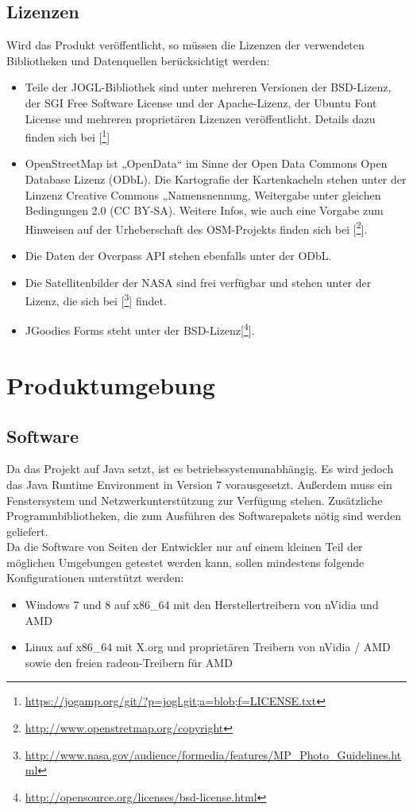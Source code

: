 \documentclass[10pt]{scrreprt}
\begin{document}
\section{Lizenzen}
Wird das Produkt veröffentlicht, so müssen die Lizenzen der verwendeten Bibliotheken und Datenquellen berücksichtigt werden:
\begin{itemize}
\item Teile der JOGL-Bibliothek sind unter mehreren Versionen der BSD-Lizenz, der SGI Free Software License und der Apache-Lizenz, der Ubuntu Font License und mehreren proprietären Lizenzen veröffentlicht. Details dazu finden sich bei [\footnote{\url{https://jogamp.org/git/?p=jogl.git;a=blob;f=LICENSE.txt}}]
\item OpenStreetMap ist „OpenData“ im Sinne der Open Data Commons Open Database Lizenz (ODbL). Die Kartografie der Kartenkacheln stehen unter der Linzenz  Creative Commons „Namensnennung, Weitergabe unter gleichen Bedingungen 2.0 (CC BY-SA). Weitere Infos, wie auch eine Vorgabe zum Hinweisen auf der Urheberschaft des OSM-Projekts finden sich bei [\footnote{\url{http://www.openstretmap.org/copyright}}].
\item Die Daten der Overpass API stehen ebenfalls unter der ODbL.
\item Die Satellitenbilder der NASA sind frei verfügbar und stehen unter der Lizenz, die sich bei [\footnote{\url{http://www.nasa.gov/audience/formedia/features/MP_Photo_Guidelines.html}}] findet.
\item JGoodies Forms steht unter der BSD-Lizenz[\footnote{\url{http://opensource.org/licenses/bsd-license.html}}].
\end{itemize}




\chapter{Produktumgebung}
\section{Software}
Da das Projekt auf Java setzt, ist es betriebssystemunabhängig. Es wird jedoch das Java Runtime Environment in Version 7 vorausgesetzt. Außerdem muss ein Fenstersystem und Netzwerkunterstützung zur Verfügung stehen. Zusätzliche Programmbibliotheken, die zum Ausführen des Softwarepakets nötig sind werden geliefert.\\

Da die Software von Seiten der Entwickler nur auf einem kleinen Teil der möglichen Umgebungen getestet werden kann, sollen mindestens folgende Konfigurationen unterstützt werden:
\begin{itemize}
\item Windows 7 und 8 auf x86{\_}64 mit den Herstellertreibern von nVidia und AMD
\item Linux auf x86{\_}64 mit X.org und proprietären Treibern von nVidia / AMD sowie den freien radeon-Treibern für AMD
\end{itemize}
\end{document}
